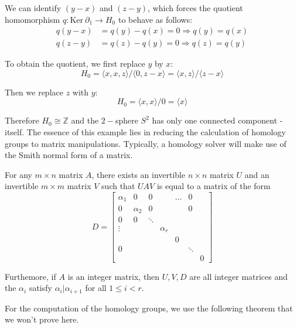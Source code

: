 We can identify $(y-x)$ and $(z-y)$, which forces the quotient homomorphism $q: \text{Ker}\:\partial_{1} \to H_{0}$ to behave as follows:
\begin{align*}
  q(y-x) &= q(y) - q(x) = 0 \Longrightarrow q(y) = q(x) \\
  q(z-y) &= q(z) - q(y) = 0 \Longrightarrow q(z) = q(y)
\end{align*}

To obtain the quotient, we first replace $y$ by $x$:
\begin{equation*}
  H_{0} = \langle x,x,z \rangle / \langle 0, z-x \rangle = \langle x,z \rangle / \langle z-x \rangle
\end{equation*}

Then we replace $z$ with $y$:
\begin{equation*}
  H_{0} = \langle x,x \rangle / 0 = \langle x \rangle
\end{equation*}

Therefore $H_{0} \cong \mathbb{Z}$ and the $2-$sphere $S^{2}$ has only one connected component - itself. The essence of this example lies in reducing the calculation of homology groups to matrix manipulations. Typically, a homology solver will make use of the Smith normal form of a matrix.

\begin{definition}
  For any $m \times n$ matrix $A$, there exists an invertible $n \times n$ matrix $U$ and an invertible $m \times m$ matrix $V$ such that $UAV$ is equal to a matrix of the form
  \begin{equation*}
    D =
    \begin{bmatrix}
      \alpha_1 & 0 & 0 & & \dots & 0\\
      0 & \alpha_2 & 0 & & & 0\\
      0 & 0 & \ddots \\
      \vdots & & & \alpha_r \\
               & & & & 0\\
      0 & & & & & \ddots \\
               & & & & & & 0
    \end{bmatrix}
  \end{equation*}

  Furthemore, if $A$ is an integer matrix, then $U,V,D$ are all integer matrices and the $\alpha_{i}$ satisfy $\alpha_{i} | \alpha_{i+1}$ for all $1 \leq i < r$.
\end{definition}

For the computation of the homology groups, we use the following theorem that we won't prove here.


